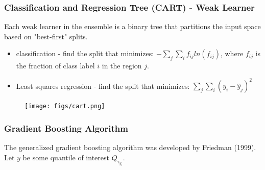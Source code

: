 \documentclass[t, pdftex]{beamer}
\begin{document}
\begin{frame}[shrink=10, noframenumbering]
\frametitle{Classification and Regression Tree (CART) - Weak Learner}
Each weak learner in the ensemble is a binary tree that partitions the input space based on "best-first" splits.  
\begin{itemize}
\item classification - find the split that minimizes: $-\sum_j\sum_i f_{ij} ln(f_{ij})$, where $f_{ij}$ is the fraction of class label $i$ in the region $j$.
\item Least squares regression - find the split that minimizes: $\sum_j\sum_i(y_i - \hat y_{j})^2$
\end{itemize}

\begin{figure}[!htbp]
\centering
\texttt{[image: figs/cart.png]}
\label{model_overview}
\end{figure}
\end{frame}

\begin{frame}[shrink=20]
\frametitle{Gradient Boosting Algorithm}

The generalized gradient boosting algorithm was developed by Friedman (1999).
Let $y$ be some quantile of interest $Q_{\tau_{y_i}}$.
%
%
%
%
\end{frame}
\end{document}
